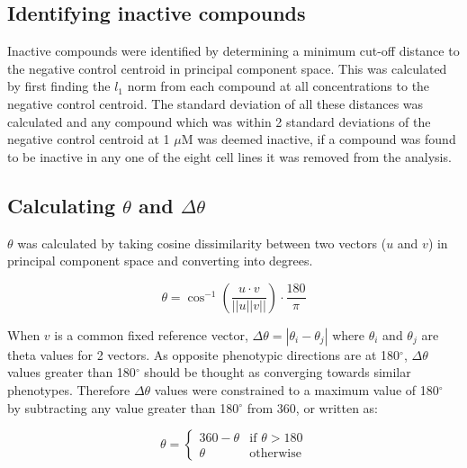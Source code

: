 \documentclass[a4paper,11pt,twoside,openright]{scrbook}
\begin{document}
\subsection{Identifying inactive compounds}

Inactive compounds were identified by determining a minimum cut-off distance to the negative control centroid in 
principal component space.
This was calculated by first finding the $l_1$ norm from each compound at all concentrations to the negative control 
centroid.
The standard deviation of all these distances was calculated and any compound which was within 2 standard deviations of 
the negative control centroid at 1 $\mu$M was deemed inactive, if a compound was found to be inactive in any one of the 
eight cell lines it was removed from the analysis.


\subsection{Calculating $\theta$ and $\Delta\theta$}

$\theta$ was calculated by taking cosine dissimilarity between two vectors ($u$ and $v$) in principal component space 
and converting into degrees.

\begin{equation} \label{equation:theta}
        \theta = \cos^{-1} \left( \frac{u \cdot v}{||u||v||} \right) \cdot \frac{180}{\pi}
\end{equation}

When $v$ is a common fixed reference vector, $\Delta\theta = |\theta_i - \theta_j|$ where $\theta_i$ and $\theta_j$ are 
theta values for 2 vectors.
As opposite phenotypic directions are at 180$^\circ$, $\Delta\theta$ values greater than 180$^\circ$ should be thought 
as converging towards similar phenotypes.
Therefore $\Delta\theta$ values were constrained to a maximum value of 180$^\circ$ by subtracting any value greater 
than 180$^\circ$ from 360, or written as:

\begin{equation}
\theta = 
    \begin{cases}
        360 - \theta & \text{if } \theta > 180\\
        \theta       & \text{otherwise}
    \end{cases}
\end{equation}
\end{document}
